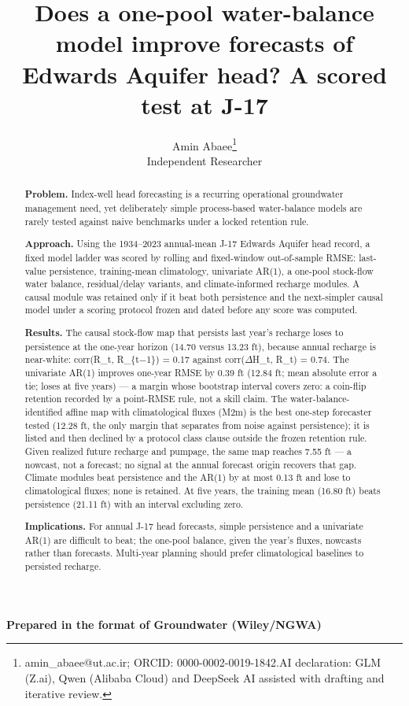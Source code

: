 \documentclass[11pt]{article}
\begin{document}
\title{Does a one-pool water-balance model improve forecasts of Edwards Aquifer head? A scored test at J-17}
\author{Amin Abaee\thanks{amin\_abaee@ut.ac.ir; ORCID: 0000-0002-0019-1842.\newline AI declaration: GLM (Z.ai), Qwen (Alibaba Cloud) and DeepSeek AI assisted with drafting and iterative review.} \\ Independent Researcher}
\date{}
\maketitle

{\centering\small \textbf{Prepared in the format of Groundwater (Wiley/NGWA)}\par}

\begin{abstract}


\textbf{Problem.} Index-well head forecasting is a recurring operational
groundwater management need, yet deliberately simple process-based
water-balance models are rarely tested against naive benchmarks under a
locked retention rule.

\textbf{Approach.} Using the 1934--2023 annual-mean J-17 Edwards Aquifer
head record, a fixed model ladder was scored by rolling and fixed-window
out-of-sample RMSE: last-value persistence, training-mean climatology,
univariate AR(1), a one-pool stock-flow water balance, residual/delay
variants, and climate-informed recharge modules. A causal module was
retained only if it beat both persistence and the next-simpler causal
model under a scoring protocol frozen and dated before any score was
computed.

\textbf{Results.} The causal stock-flow map that persists last year's
recharge loses to persistence at the one-year horizon (14.70 versus
13.23 ft), because annual recharge is near-white: corr(R\_t, R\_\{t\ensuremath{-}1\})
= 0.17 against corr(\ensuremath{\Delta}H\_t, R\_t) = 0.74. The univariate AR(1) improves
one-year RMSE by 0.39 ft (12.84 ft; mean absolute error a tie; loses at
five years) --- a margin whose bootstrap interval covers zero: a
coin-flip retention recorded by a point-RMSE rule, not a skill claim.
The water-balance-identified affine map with climatological fluxes (M2m)
is the best one-step forecaster tested (12.28 ft, the only margin that
separates from noise against persistence); it is listed and then
declined by a protocol class clause outside the frozen retention rule.
Given realized future recharge and pumpage, the same map reaches 7.55 ft
--- a nowcast, not a forecast; no signal at the annual forecast origin
recovers that gap. Climate modules beat persistence and the AR(1) by at
most 0.13 ft and lose to climatological fluxes; none is retained. At
five years, the training mean (16.80 ft) beats persistence (21.11 ft)
with an interval excluding zero.

\textbf{Implications.} For annual J-17 head forecasts, simple
persistence and a univariate AR(1) are difficult to beat; the one-pool
balance, given the year's fluxes, nowcasts rather than forecasts.
Multi-year planning should prefer climatological baselines to persisted
recharge.

\end{abstract}
\end{document}

